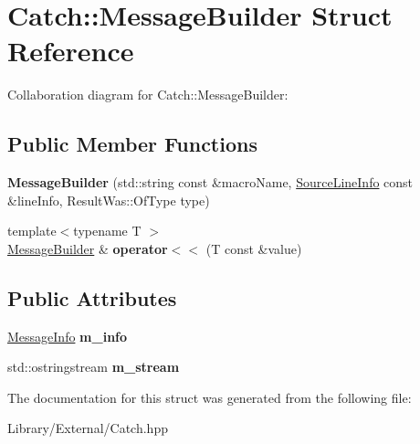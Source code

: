 \hypertarget{struct_catch_1_1_message_builder}{}\section{Catch\+:\+:Message\+Builder Struct Reference}
\label{struct_catch_1_1_message_builder}


Collaboration diagram for Catch\+:\+:Message\+Builder\+:
\subsection*{Public Member Functions}
\begin{DoxyCompactItemize}
\item 
\hypertarget{struct_catch_1_1_message_builder_ab0c6378e722680bf58852c6ee2b6e724}{}{\bfseries Message\+Builder} (std\+::string const \&macro\+Name, \hyperlink{struct_catch_1_1_source_line_info}{Source\+Line\+Info} const \&line\+Info, Result\+Was\+::\+Of\+Type type)\label{struct_catch_1_1_message_builder_ab0c6378e722680bf58852c6ee2b6e724}

\item 
\hypertarget{struct_catch_1_1_message_builder_a20fa48d069b20dddcc2d3df8abb123c1}{}{\footnotesize template$<$typename T $>$ }\\\hyperlink{struct_catch_1_1_message_builder}{Message\+Builder} \& {\bfseries operator$<$$<$} (T const \&value)\label{struct_catch_1_1_message_builder_a20fa48d069b20dddcc2d3df8abb123c1}

\end{DoxyCompactItemize}
\subsection*{Public Attributes}
\begin{DoxyCompactItemize}
\item 
\hypertarget{struct_catch_1_1_message_builder_a979f1c2b36d78f80ee275bfa5ba0209f}{}\hyperlink{struct_catch_1_1_message_info}{Message\+Info} {\bfseries m\+\_\+info}\label{struct_catch_1_1_message_builder_a979f1c2b36d78f80ee275bfa5ba0209f}

\item 
\hypertarget{struct_catch_1_1_message_builder_a6488ab0cc4ea52affc9c0612c7c5df6b}{}std\+::ostringstream {\bfseries m\+\_\+stream}\label{struct_catch_1_1_message_builder_a6488ab0cc4ea52affc9c0612c7c5df6b}

\end{DoxyCompactItemize}


The documentation for this struct was generated from the following file\+:\begin{DoxyCompactItemize}
\item 
Library/\+External/Catch.\+hpp\end{DoxyCompactItemize}
